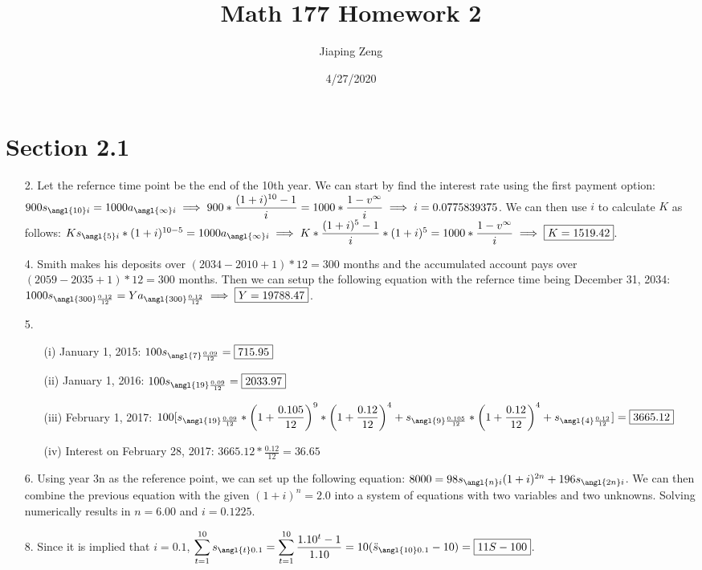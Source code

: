 \documentclass{article}
\title{Math 177 Homework 2}
\date{4/27/2020}
\author{Jiaping Zeng}
\begin{document}
\maketitle

\section*{Section 2.1}
\begin{itemize}
	\item [2.] Let the refernce time point be the end of the 10th year. We can start by find the interest rate using the first payment option: $900s_{\angl{10}i}=1000a_{\angl{\infty}i}
		      \implies 900*\dfrac{(1+i)^{10}-1}{i}=1000*\dfrac{1-v^{\infty}}{i} \implies i=0.0775839375$. We can then use $i$ to calculate $K$ as follows: $Ks_{\angl{5}i}*(1+i)^{10-5}=1000a_{\angl{\infty}i} \implies K*\dfrac{(1+i)^5-1}{i}*(1+i)^{5}=1000*\dfrac{1-v^{\infty}}{i} \implies \boxed{K=1519.42}$.
	\item [4.] Smith makes his deposits over $(2034-2010+1)*12=300$ months and the accumulated account pays over $(2059-2035+1)*12=300$ months. Then we can setup the following equation with the refernce time being December 31, 2034: $1000s_{\angl{300}\frac{0.12}{12}}=Ya_{\angl{300}\frac{0.12}{12}} \implies \boxed{Y=19788.47}$.
	\item [5.]
	      \begin{itemize}
		      \item [(i)] January 1, 2015: $100s_{\angl{7}\frac{0.09}{12}}=\boxed{715.95}$
		      \item [(ii)] January 1, 2016: $100s_{\angl{19}\frac{0.09}{12}}=\boxed{2033.97}$
		      \item [(iii)] February 1, 2017: $100[s_{\angl{19}\frac{0.09}{12}}*\left(1+\dfrac{0.105}{12}\right)^9*\left(1+\dfrac{0.12}{12}\right)^4+s_{\angl{9}\frac{0.105}{12}}*\left(1+\dfrac{0.12}{12}\right)^4+s_{\angl{4}\frac{0.12}{12}}]=\boxed{3665.12}$
		      \item [(iv)] Interest on February 28, 2017: $3665.12*\frac{0.12}{12}=\boxed{36.65}$
	      \end{itemize}
	\item [6.] Using year 3n as the reference point, we can set up the following equation: $8000=98s_{\angl{n}i}(1+i)^{2n}+196s_{\angl{2n}i}$. We can then combine the previous equation with the given $(1+i)^n=2.0$ into a system of equations with two variables and two unknowns. Solving numerically results in $n=6.00$ and $\boxed{i=0.1225}$.
	\item [8.] Since it is implied that $i=0.1$, $\mathlarger{\sum_{t=1}^{10} s_{\angl{t}0.1}=\sum_{t=1}^{10} \frac{1.10^t-1}{1.10}=10(\ddot{s}_{\angl{10}0.1}-10)}=\boxed{11S-100}$.

\end{itemize}
\end{document}
